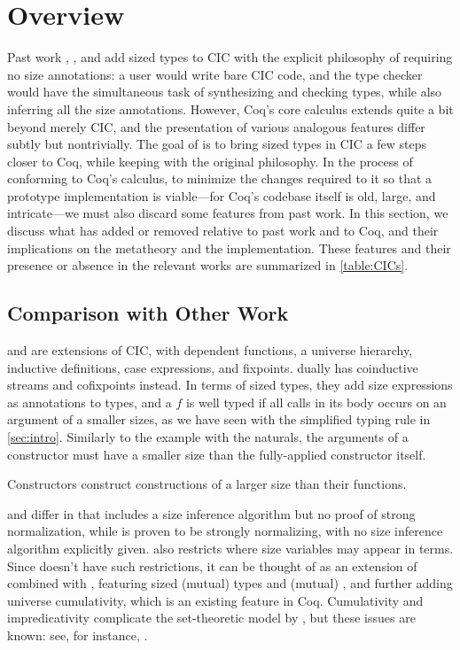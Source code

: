 \section{Overview}\label{sec:overview}

Past work \CIChat, \CIChatminus, and \CChatomega add sized types to CIC with the explicit philosophy of requiring no size annotations:
a user would write bare CIC code, and the type checker would have the simultaneous task of synthesizing and checking types,
while also inferring all the size annotations.
However, Coq's core calculus extends quite a bit beyond merely CIC,
and the presentation of various analogous features differ subtly but nontrivially.
The goal of \lang is to bring sized types in CIC a few steps closer to Coq,
while keeping with the original philosophy.
In the process of conforming to Coq's calculus, to minimize the changes required to it so that a prototype implementation is
viable---for Coq's codebase itself is old, large, and intricate---we
must also discard some features from past work.
In this section, we discuss what \lang has added or removed relative to past work and to Coq,
and their implications on the metatheory and the implementation.
These features and their presence or absence in the relevant works are summarized in \autoref{table:CICs}.

\subsection{Comparison with Other Work}\label{sec:overview:comparison}

\CIChat and \CIChatminus are extensions of CIC, with dependent functions, a universe hierarchy, inductive definitions, case expressions, and fixpoints.
\CChatomega dually has coinductive streams and cofixpoints instead.
In terms of sized types, they add size expressions as annotations to \coinductive types,
and a \cofixpoint $f$ is well typed if all \corecursive calls in its body occurs on an argument of a smaller sizes,
as we have seen with the simplified typing rule in \autoref{sec:intro}.
Similarly to the example with the naturals,
the \corecursive arguments of a constructor must have a smaller size
than the fully-applied constructor itself.

Constructors construct constructions of a larger size than their \corecursive functions.

\CIChat and \CIChatminus differ in that \CIChat includes a size inference algorithm but no proof of strong normalization,
while \CIChatminus is proven to be strongly normalizing, with no size inference algorithm explicitly given.
\CIChatminus also restricts where size variables may appear in terms.
Since \lang doesn't have such restrictions, it can be thought of as an extension of \CIChat combined with \CChatomega,
featuring sized (mutual) \coinductive types and (mutual) \cofixpoints,
and further adding universe cumulativity, which is an existing feature in Coq.
Cumulativity and impredicativity complicate the set-theoretic model by \citet{cic-hat-minus}, but these issues are known: see, for instance, \citet{not-so-simple-cc}.

